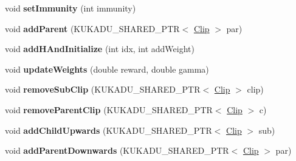 \begin{DoxyCompactItemize}
\item 
\hypertarget{classkukadu_1_1Clip_ab31cf5283dab670017ae01e5ebf35afb}{void {\bfseries set\-Immunity} (int immunity)}\label{classkukadu_1_1Clip_ab31cf5283dab670017ae01e5ebf35afb}

\item 
\hypertarget{classkukadu_1_1Clip_a9f8015a0b15359f9ce5101cfa01954ba}{void {\bfseries add\-Parent} (K\-U\-K\-A\-D\-U\-\_\-\-S\-H\-A\-R\-E\-D\-\_\-\-P\-T\-R$<$ \hyperlink{classkukadu_1_1Clip}{Clip} $>$ par)}\label{classkukadu_1_1Clip_a9f8015a0b15359f9ce5101cfa01954ba}

\item 
\hypertarget{classkukadu_1_1Clip_a79f9730aaded88c922fc1693582b62e0}{void {\bfseries add\-H\-And\-Initialize} (int idx, int add\-Weight)}\label{classkukadu_1_1Clip_a79f9730aaded88c922fc1693582b62e0}

\item 
\hypertarget{classkukadu_1_1Clip_a6845f2bed6e81c012c3475e0497b0448}{void {\bfseries update\-Weights} (double reward, double gamma)}\label{classkukadu_1_1Clip_a6845f2bed6e81c012c3475e0497b0448}

\item 
\hypertarget{classkukadu_1_1Clip_a95eee9c3a13b7b202bfdf6d4b29603d9}{void {\bfseries remove\-Sub\-Clip} (K\-U\-K\-A\-D\-U\-\_\-\-S\-H\-A\-R\-E\-D\-\_\-\-P\-T\-R$<$ \hyperlink{classkukadu_1_1Clip}{Clip} $>$ clip)}\label{classkukadu_1_1Clip_a95eee9c3a13b7b202bfdf6d4b29603d9}

\item 
\hypertarget{classkukadu_1_1Clip_a3d65cf6aadee55889068d9734ab4b9b9}{void {\bfseries remove\-Parent\-Clip} (K\-U\-K\-A\-D\-U\-\_\-\-S\-H\-A\-R\-E\-D\-\_\-\-P\-T\-R$<$ \hyperlink{classkukadu_1_1Clip}{Clip} $>$ c)}\label{classkukadu_1_1Clip_a3d65cf6aadee55889068d9734ab4b9b9}

\item 
\hypertarget{classkukadu_1_1Clip_a5cd572f564c87baaef107e88f0097d57}{void {\bfseries add\-Child\-Upwards} (K\-U\-K\-A\-D\-U\-\_\-\-S\-H\-A\-R\-E\-D\-\_\-\-P\-T\-R$<$ \hyperlink{classkukadu_1_1Clip}{Clip} $>$ sub)}\label{classkukadu_1_1Clip_a5cd572f564c87baaef107e88f0097d57}

\item 
\hypertarget{classkukadu_1_1Clip_a6183ebd44f8c20e2b588e0d85c616c34}{void {\bfseries add\-Parent\-Downwards} (K\-U\-K\-A\-D\-U\-\_\-\-S\-H\-A\-R\-E\-D\-\_\-\-P\-T\-R$<$ \hyperlink{classkukadu_1_1Clip}{Clip} $>$ par)}\label{classkukadu_1_1Clip_a6183ebd44f8c20e2b588e0d85c616c34}


\end{DoxyCompactItemize}
